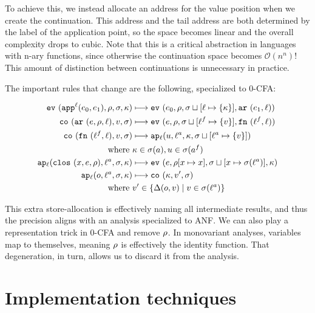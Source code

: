 \documentclass[preprint,onecolumn,9pt]{sigplanconf} %
\begin{document}
To achieve this, we instead allocate an address for the value position
when we create the continuation.  This address and the tail address
are both determined by the label of the application point, so the
space becomes linear and the overall complexity drops to cubic. Note
that this is a critical abstraction in languages with n-ary functions,
since otherwise the continuation space becomes ${\mathcal O}(n^n)$!
This amount of distinction between continuations is unnecessary
in practice.

The important rules that change are the following, specialized to 0-CFA:

\begin{align*}
\ev{\sapp[^\mlab]{\mexpi0}{\mexpi1},\menv,\msto,\mkont} &\machstep
\ev{\mexpi{0},\menv,\msto\sqcup[\mlab \mapsto \{\mkont\}],\kar{\mexpi{1},\mlab}}
\\
\co{\kar{\mexp,\menv,\mlab},\mval,\msto} & \machstep
\ev{\mexp,\menv,\msto\sqcup[\mlab^f \mapsto \{\mval\}],\kfn{\mlab^f,\mlab}}
\\
\co{\kfn{\mlab^f,\mlab},\mval,\msto} & \machstep
\ap[_\mlab]{\mvalx{u},\mlab^a,\mkont,\msto\sqcup[\mlab^a \mapsto \{\mval\}]}
\\
\text{ where } &\mkont \in \msto(\maddr), \mvalx{u} \in \msto(\maddr^f)
\\
\ap[_\mlab]{\clos{\mvar,\mexp,\menv},\mlab^a, \msto,\mkont} & \machstep
\ev{\mexp,\menv[\mvar\mapsto\mvar],\msto\sqcup[\mvar \mapsto \msto(\mlab^a)],\mkont}
\\
\ap[_\mlab]{\mop,\mlab^a,\msto,\mkont} & \machstep
\co{\mkont,\mval',\msto}
\\
\text{ where }& \mval'\in \{\interpdelta(\mop,\mval) \mid \mval \in \msto(\mlab^a)\}
\end{align*}

This extra store-allocation is effectively naming all intermediate
results, and thus the precision aligns with an analysis specialized to
ANF. We can also play a representation trick in 0-CFA and remove
$\menv$. In monovariant analyses, variables map to themselves, meaning
$\menv$ is effectively the identity function. That degeneration, in
turn, allows us to discard it from the analysis.


\section{Implementation techniques}
\label{sec:opt}
\end{document}
